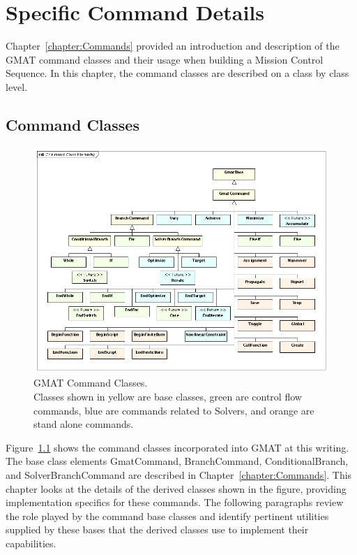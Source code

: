 \chapter{\label{chapter:SpecificCommands}Specific Command Details}

Chapter~\ref{chapter:Commands} provided an introduction and description of the GMAT command classes
and their usage when building a Mission Control Sequence.  In this chapter, the command
classes are described on a class by class level.

\section{\label{section:CommandClasses}Command Classes}

\begin{figure}[htb]
\begin{center}
\includegraphics[420,320]{Images/CommandClassHierarchy.png}
\caption[GMAT Command Classes]{\label{figure:CommandClassDiagram}GMAT Command Classes.\\Classes
shown in yellow are base classes, green are control flow commands, blue are commands related to
Solvers, and orange are stand alone commands.}
\end{center}
\end{figure}

Figure~\ref{figure:CommandClassDiagram} shows the command classes incorporated into GMAT at this
writing.  The base class elements GmatCommand, BranchCommand, ConditionalBranch, and
SolverBranchCommand are described in Chapter~\ref{chapter:Commands}.  This chapter looks at the
details of the derived classes shown in the figure, providing implementation specifics for these
commands.  The following paragraphs review the role played by the command base classes and identify
pertinent utilities supplied by these bases that the derived classes use to implement their
capabilities.

